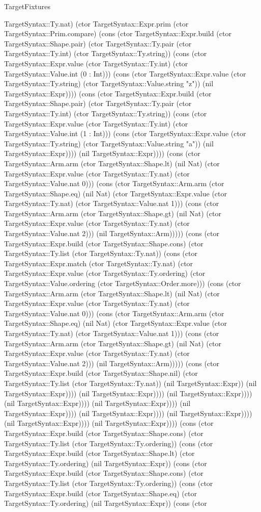 \begin{lexlean}{TargetFixtures}
\begin{semanticmodule}
{TargetSyntax::Ty.nat) (ctor TargetSyntax::Expr.prim (ctor TargetSyntax::Prim.compare) (cons (ctor TargetSyntax::Expr.build (ctor TargetSyntax::Shape.pair) (ctor TargetSyntax::Ty.pair (ctor TargetSyntax::Ty.int) (ctor TargetSyntax::Ty.string)) (cons (ctor TargetSyntax::Expr.value (ctor TargetSyntax::Ty.int) (ctor TargetSyntax::Value.int (0 : Int))) (cons (ctor TargetSyntax::Expr.value (ctor TargetSyntax::Ty.string) (ctor TargetSyntax::Value.string "z")) (nil TargetSyntax::Expr)))) (cons (ctor TargetSyntax::Expr.build (ctor TargetSyntax::Shape.pair) (ctor TargetSyntax::Ty.pair (ctor TargetSyntax::Ty.int) (ctor TargetSyntax::Ty.string)) (cons (ctor TargetSyntax::Expr.value (ctor TargetSyntax::Ty.int) (ctor TargetSyntax::Value.int (1 : Int))) (cons (ctor TargetSyntax::Expr.value (ctor TargetSyntax::Ty.string) (ctor TargetSyntax::Value.string "a")) (nil TargetSyntax::Expr)))) (nil TargetSyntax::Expr)))) (cons (ctor TargetSyntax::Arm.arm (ctor TargetSyntax::Shape.lt) (nil Nat) (ctor TargetSyntax::Expr.value (ctor TargetSyntax::Ty.nat) (ctor TargetSyntax::Value.nat 0))) (cons (ctor TargetSyntax::Arm.arm (ctor TargetSyntax::Shape.eq) (nil Nat) (ctor TargetSyntax::Expr.value (ctor TargetSyntax::Ty.nat) (ctor TargetSyntax::Value.nat 1))) (cons (ctor TargetSyntax::Arm.arm (ctor TargetSyntax::Shape.gt) (nil Nat) (ctor TargetSyntax::Expr.value (ctor TargetSyntax::Ty.nat) (ctor TargetSyntax::Value.nat 2))) (nil TargetSyntax::Arm))))) (cons (ctor TargetSyntax::Expr.build (ctor TargetSyntax::Shape.cons) (ctor TargetSyntax::Ty.list (ctor TargetSyntax::Ty.nat)) (cons (ctor TargetSyntax::Expr.match (ctor TargetSyntax::Ty.nat) (ctor TargetSyntax::Expr.value (ctor TargetSyntax::Ty.ordering) (ctor TargetSyntax::Value.ordering (ctor TargetSyntax::Order.more))) (cons (ctor TargetSyntax::Arm.arm (ctor TargetSyntax::Shape.lt) (nil Nat) (ctor TargetSyntax::Expr.value (ctor TargetSyntax::Ty.nat) (ctor TargetSyntax::Value.nat 0))) (cons (ctor TargetSyntax::Arm.arm (ctor TargetSyntax::Shape.eq) (nil Nat) (ctor TargetSyntax::Expr.value (ctor TargetSyntax::Ty.nat) (ctor TargetSyntax::Value.nat 1))) (cons (ctor TargetSyntax::Arm.arm (ctor TargetSyntax::Shape.gt) (nil Nat) (ctor TargetSyntax::Expr.value (ctor TargetSyntax::Ty.nat) (ctor TargetSyntax::Value.nat 2))) (nil TargetSyntax::Arm))))) (cons (ctor TargetSyntax::Expr.build (ctor TargetSyntax::Shape.nil) (ctor TargetSyntax::Ty.list (ctor TargetSyntax::Ty.nat)) (nil TargetSyntax::Expr)) (nil TargetSyntax::Expr)))) (nil TargetSyntax::Expr)))) (nil TargetSyntax::Expr)))) (nil TargetSyntax::Expr)))) (nil TargetSyntax::Expr)))) (nil TargetSyntax::Expr)))) (nil TargetSyntax::Expr)))) (nil TargetSyntax::Expr)))) (nil TargetSyntax::Expr)))) (nil TargetSyntax::Expr)))) (cons (ctor TargetSyntax::Expr.build (ctor TargetSyntax::Shape.cons) (ctor TargetSyntax::Ty.list (ctor TargetSyntax::Ty.ordering)) (cons (ctor TargetSyntax::Expr.build (ctor TargetSyntax::Shape.lt) (ctor TargetSyntax::Ty.ordering) (nil TargetSyntax::Expr)) (cons (ctor TargetSyntax::Expr.build (ctor TargetSyntax::Shape.cons) (ctor TargetSyntax::Ty.list (ctor TargetSyntax::Ty.ordering)) (cons (ctor TargetSyntax::Expr.build (ctor TargetSyntax::Shape.eq) (ctor TargetSyntax::Ty.ordering) (nil TargetSyntax::Expr)) (cons (ctor }
\end{semanticmodule}
\end{lexlean}
